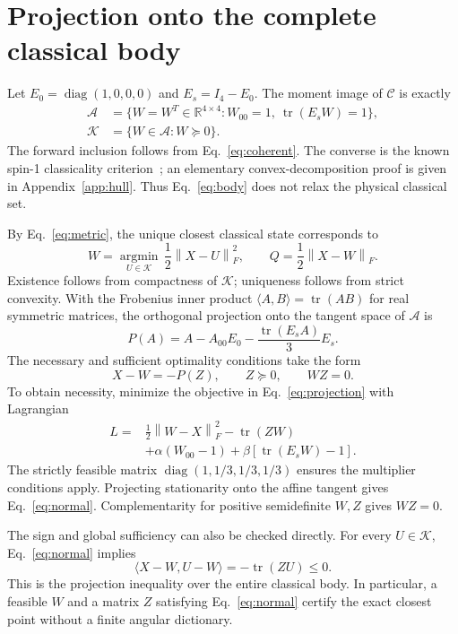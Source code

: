 \documentclass[aps,pra,reprint,amsmath,amssymb,superscriptaddress,longbibliography]{revtex4-2}
\newcommand{\tr}{\operatorname{tr}}
\newcommand{\diag}{\operatorname{diag}}
\newcommand{\Id}{I}
\newcommand{\Ccal}{\mathcal C}
\newcommand{\Kcal}{\mathcal K}
\newcommand{\Acal}{\mathcal A}
\newcommand{\norm}[1]{\left\lVert #1\right\rVert}
\newcommand{\ip}[2]{\langle #1,#2\rangle}
\begin{document}
\section{Projection onto the complete classical body}
\label{sec:projection}

Let \(E_0=\diag(1,0,0,0)\) and \(E_s=\Id_4-E_0\). The moment image of \(\Ccal\) is exactly
\begin{align}
 \Acal&=\{W=W^T\in\mathbb R^{4\times4}:
          W_{00}=1,\ \tr(E_sW)=1\},\nonumber\\
 \Kcal&=\{W\in\Acal:W\succeq0\}.
 \label{eq:body}
\end{align}
The forward inclusion follows from Eq.~\eqref{eq:coherent}. The converse is the known spin-1 classicality criterion~\cite{Bohnet2016}; an elementary convex-decomposition proof is given in Appendix~\ref{app:hull}. Thus Eq.~\eqref{eq:body} does not relax the physical classical set.

By Eq.~\eqref{eq:metric}, the unique closest classical state corresponds to
\begin{equation}
 W=\underset{U\in\Kcal}{\operatorname{argmin}}\,
                  \frac12\norm{X-U}_F^2,
 \qquad Q=\frac12\norm{X-W}_F.
 \label{eq:projection}
\end{equation}
Existence follows from compactness of \(\Kcal\); uniqueness follows from strict convexity. With the Frobenius inner product \(\ip{A}{B}=\tr(AB)\) for real symmetric matrices, the orthogonal projection onto the tangent space of \(\Acal\) is
\begin{equation}
 P(A)=A-A_{00}E_0-\frac{\tr(E_sA)}{3}E_s.
 \label{eq:tangent}
\end{equation}
The necessary and sufficient optimality conditions take the form
\begin{equation}
 X-W=-P(Z),\qquad Z\succeq0,\qquad WZ=0.
 \label{eq:normal}
\end{equation}
To obtain necessity, minimize the objective in Eq.~\eqref{eq:projection} with Lagrangian
\begin{align}
 L={}&\tfrac12\norm{W-X}_F^2-\tr(ZW)\nonumber\\
    &+\alpha(W_{00}-1)+\beta[\tr(E_sW)-1].
\end{align}
The strictly feasible matrix \(\diag(1,1/3,1/3,1/3)\) ensures the multiplier conditions apply. Projecting stationarity onto the affine tangent gives Eq.~\eqref{eq:normal}. Complementarity for positive semidefinite \(W,Z\) gives \(WZ=0\).

The sign and global sufficiency can also be checked directly. For every \(U\in\Kcal\), Eq.~\eqref{eq:normal} implies
\begin{equation}
 \ip{X-W}{U-W}=-\tr(ZU)\leq0.
 \label{eq:certificate}
\end{equation}
This is the projection inequality over the entire classical body. In particular, a feasible \(W\) and a matrix \(Z\) satisfying Eq.~\eqref{eq:normal} certify the exact closest point without a finite angular dictionary.
\end{document}
